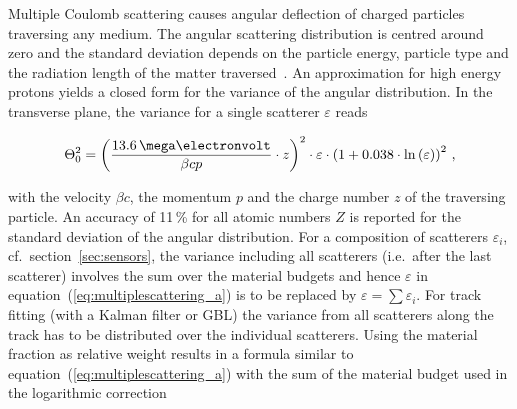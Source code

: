 % 
%
%
%
%
%
Multiple Coulomb scattering causes angular deflection of charged particles traversing any medium.
The angular scattering distribution is centred around zero
 and the standard deviation depends on the particle energy, particle type and the radiation length of the matter traversed~\cite{ref:scatteringhighland}.
An approximation for high energy protons yields a closed form for the variance of the angular distribution. 
In the transverse plane, the variance for a single scatterer $\varepsilon$ reads~\cite{ref:PDG-2014}

\begin{equation}
\label{eq:multiplescattering_a}
\Theta_{0}^{2} = \left( \frac{13.6\,\mega\electronvolt}{\beta c p} \cdot z \right)^2
\cdot \varepsilon
\cdot \left( 1 + 0.038 \cdot \ln{\left( \varepsilon \right) } \right)^2 \,,
\end{equation}

\noindent with the velocity $\beta c$, the momentum $p$ and the charge number $z$ of the traversing particle. 
An accuracy of 11\,\% for all atomic numbers $Z$ is reported for the standard deviation of the angular distribution. 
For a composition of scatterers $\varepsilon_i$, cf.\ section~\ref{sec:sensors}, the variance including all scatterers (i.e.\ after the last scatterer)
 involves the sum over the material budgets and hence $\varepsilon$ in equation~(\ref{eq:multiplescattering_a}) is to be replaced by $\varepsilon = \sum \varepsilon_i$. 
For track fitting (with a Kalman filter or GBL) the variance from all scatterers along the track has to be distributed over the individual scatterers. 
Using the material fraction as relative weight results in a formula similar to equation~(\ref{eq:multiplescattering_a})
 with the sum of the material budget used in the logarithmic correction

